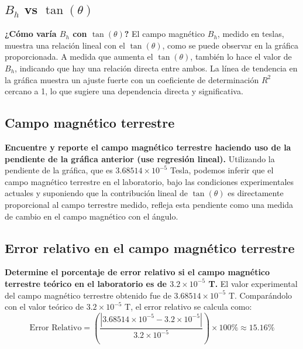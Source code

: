 \subsection{$B_h$ vs $\tan(\theta)$}
\textbf{¿Cómo varía $B_h$ con $\tan(\theta)$?}
El campo magnético $B_h$, medido en teslas, muestra una relación lineal con el $\tan(\theta)$, como se puede observar en la gráfica proporcionada. A medida que aumenta el $\tan(\theta)$, también lo hace el valor de $B_h$, indicando que hay una relación directa entre ambos. La línea de tendencia en la gráfica muestra un ajuste fuerte con un coeficiente de determinación $R^2$ cercano a 1, lo que sugiere una dependencia directa y significativa.

\subsection{Campo magnético terrestre}
\textbf{Encuentre y reporte el campo magnético terrestre haciendo uso de la pendiente de la gráfica anterior (use regresión lineal).}
Utilizando la pendiente de la gráfica, que es $3.68514 \times 10^{-5}$ Tesla, podemos inferir que el campo magnético terrestre en el laboratorio, bajo las condiciones experimentales actuales y suponiendo que la contribución lineal de $\tan(\theta)$ es directamente proporcional al campo terrestre medido, refleja esta pendiente como una medida de cambio en el campo magnético con el ángulo.

\subsection{Error relativo en el campo magnético terrestre}
\textbf{Determine el porcentaje de error relativo si el campo magnético terrestre teórico en el laboratorio es de $3.2 \times 10^{-5}$ T.}
El valor experimental del campo magnético terrestre obtenido fue de $3.68514 \times 10^{-5}$ T. Comparándolo con el valor teórico de $3.2 \times 10^{-5}$ T, el error relativo se calcula como:
\[
\text{Error Relativo} = \left(\frac{|3.68514 \times 10^{-5} - 3.2 \times 10^{-5}|}{3.2 \times 10^{-5}}\right) \times 100\% \approx 15.16\%
\]

